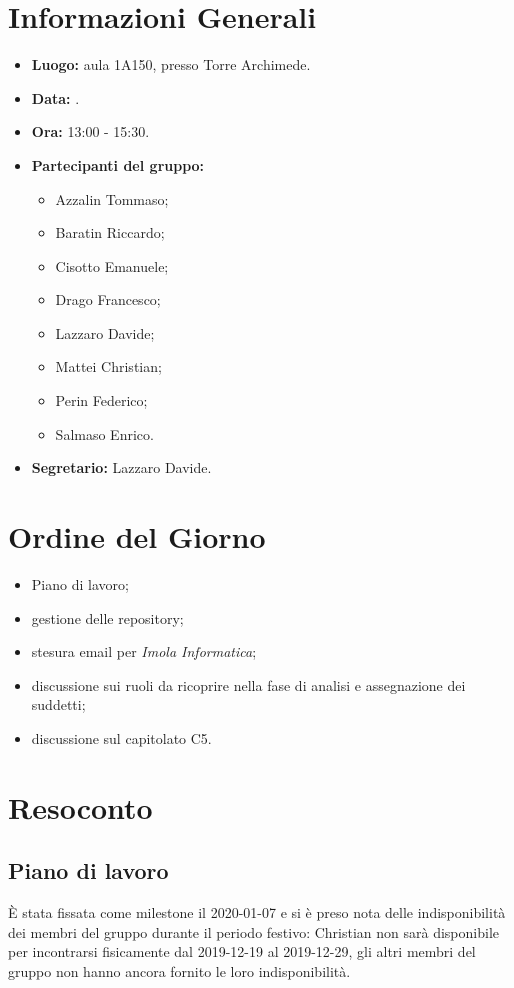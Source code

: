 \section{Informazioni Generali}
\begin{itemize}
\item \textbf{Luogo:} aula 1A150, presso Torre Archimede.
\item \textbf{Data:} \Data.
\item \textbf{Ora:} 13:00 - 15:30.
\item \textbf{Partecipanti del gruppo:}
	\begin{itemize}
		\item Azzalin Tommaso; 
		\item Baratin Riccardo;
		\item Cisotto Emanuele; 
		\item Drago Francesco;
		\item Lazzaro Davide;
		\item Mattei Christian;
		\item Perin Federico;
		\item Salmaso Enrico.
	\end{itemize} 
\item \textbf{Segretario:} Lazzaro Davide.
\end{itemize}


\section{Ordine del Giorno}
\begin{itemize}
\item Piano di lavoro;
\item gestione delle repository;
\item stesura email per \textit{Imola Informatica};
\item discussione sui ruoli da ricoprire nella fase di analisi e assegnazione dei suddetti;
\item discussione sul capitolato C5.
\end{itemize}



\section{Resoconto}
\subsection{Piano di lavoro}
È stata fissata come milestone il 2020-01-07 e si è preso nota delle indisponibilità dei membri del gruppo durante il periodo festivo: Christian non sarà disponibile per incontrarsi fisicamente dal 2019-12-19 al 2019-12-29, gli altri membri del gruppo non hanno ancora fornito le loro indisponibilità. 


